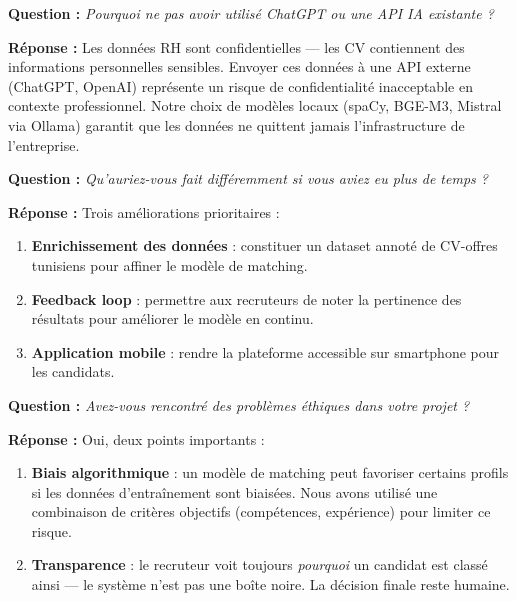 \documentclass[12pt,a4paper]{article}
\newenvironment{jury}{%
  \def\FrameCommand{\fboxsep=8pt\colorbox{orange!12}}%
  \MakeFramed{\advance\hsize-\width \FrameRestore}%
  \vspace{-4pt}%
}{\endMakeFramed}
\newenvironment{reponse}{%
  \def\FrameCommand{\fboxsep=8pt\colorbox{green!10}}%
  \MakeFramed{\advance\hsize-\width \FrameRestore}%
  \vspace{-4pt}%
}{\endMakeFramed}
\newcommand{\Q}[1]{\vspace{6pt}\noindent\textbf{\color{orange}Question :} \textit{#1}}
\newcommand{\R}[1]{\noindent\textbf{\color{vert}Réponse :} #1\vspace{6pt}}
\begin{document}
\begin{jury}
\Q{Pourquoi ne pas avoir utilisé ChatGPT ou une API IA existante ?}
\end{jury}

\begin{reponse}
\R{Les données RH sont confidentielles — les CV contiennent des informations personnelles sensibles.
Envoyer ces données à une API externe (ChatGPT, OpenAI) représente un risque de confidentialité inacceptable en contexte professionnel.
Notre choix de modèles locaux (spaCy, BGE-M3, Mistral via Ollama) garantit que les données ne quittent jamais l'infrastructure de l'entreprise.}
\end{reponse}

\begin{jury}
\Q{Qu'auriez-vous fait différemment si vous aviez eu plus de temps ?}
\end{jury}

\begin{reponse}
\R{Trois améliorations prioritaires :
\begin{enumerate}[leftmargin=1.5cm]
  \item \textbf{Enrichissement des données} : constituer un dataset annoté de CV-offres tunisiens pour affiner le modèle de matching.
  \item \textbf{Feedback loop} : permettre aux recruteurs de noter la pertinence des résultats pour améliorer le modèle en continu.
  \item \textbf{Application mobile} : rendre la plateforme accessible sur smartphone pour les candidats.
\end{enumerate}}
\end{reponse}

\begin{jury}
\Q{Avez-vous rencontré des problèmes éthiques dans votre projet ?}
\end{jury}

\begin{reponse}
\R{Oui, deux points importants :
\begin{enumerate}[leftmargin=1.5cm]
  \item \textbf{Biais algorithmique} : un modèle de matching peut favoriser certains profils si les données d'entraînement sont biaisées. Nous avons utilisé une combinaison de critères objectifs (compétences, expérience) pour limiter ce risque.
  \item \textbf{Transparence} : le recruteur voit toujours \textit{pourquoi} un candidat est classé ainsi — le système n'est pas une boîte noire. La décision finale reste humaine.
\end{enumerate}}
\end{reponse}
\end{document}
